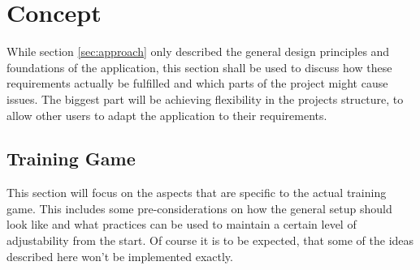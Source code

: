 \documentclass[a4paper,11pt]{article}%
\renewcommand{\\}{\vspace*{0.5\baselineskip} \newline}
\begin{document}
\section{Concept}
\label{sec:concept}
While section \ref{sec:approach} only described the general design principles and foundations of the application, this section shall be used to discuss how these requirements  actually be fulfilled and which parts of the project might cause issues.
\newline
\newline
The biggest part will be achieving flexibility in the projects structure, to allow other users to adapt the application to their requirements.


\subsection{Training Game}
\label{sec:concept_tg}
This section will focus on the aspects that are specific to the actual training game. This includes some pre-considerations on how the general setup should look like and what practices can be used to maintain a certain level of adjustability from the start. Of course it is to be expected, that some of the ideas described here won't be implemented exactly.
\end{document}
